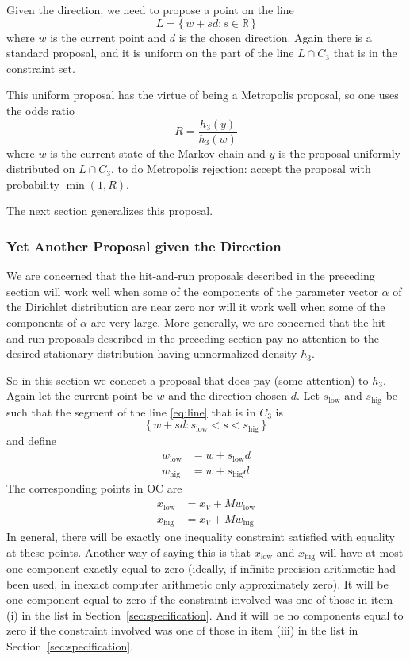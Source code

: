\documentclass[11pt]{article}
\newcommand{\real}{\mathbb{R}}
\newcommand{\set}[1]{\{\, #1 \,\}}
\begin{document}
Given the direction, we need to propose a point on the line
\begin{equation} \label{eq:line}
   L = \set{ w + s d : s \in \real }
\end{equation}
where $w$ is the current point and $d$ is the chosen direction.  Again
there is a standard proposal, and it is uniform on the part of the line
$L \cap C_3$ that is in the constraint set.

This uniform proposal has the virtue of being a Metropolis proposal,
so one uses the odds ratio
\begin{equation} \label{eq:metropolis-ratio}
   R = \frac{h_3(y)}{h_3(w)}
\end{equation}
where $w$ is the current state of the Markov chain and $y$ is the proposal
uniformly distributed on $L \cap C_3$, to do Metropolis rejection: accept
the proposal with probability $\min(1, R)$.

The next section generalizes this proposal.

\subsubsection{Yet Another Proposal given the Direction}

We are concerned that the hit-and-run proposals described in the
preceding section will work well when some of the components of the
parameter vector $\alpha$ of the Dirichlet distribution are near zero nor
will it work well when some of the components of $\alpha$ are very large.
More generally, we are concerned that the hit-and-run proposals described
in the preceding section pay no attention to the desired stationary
distribution having unnormalized density $h_3$.

So in this section we concoct a proposal that does pay (some attention)
to $h_3$.  Again let the current point be $w$ and the direction chosen $d$.
Let $s_\text{low}$ and $s_\text{hig}$ be such that the segment of the line
\eqref{eq:line} that is in $C_3$ is
$$
   \set{ w + s d : s_\text{low} < s < s_\text{hig} }
$$
and define
\begin{align*}
   w_\text{low} & = w + s_\text{low} d
   \\
   w_\text{hig} & = w + s_\text{hig} d
\end{align*}
The corresponding points in OC are
\begin{align*}
   x_\text{low} & = x_V + M w_\text{low}
   \\
   x_\text{hig} & = x_V + M w_\text{hig}
\end{align*}
In general, there will be exactly one inequality constraint satisfied with
equality at these points.
Another way of saying this is that $x_\text{low}$ and $x_\text{hig}$ will
have at most one component exactly equal to zero (ideally, if infinite
precision arithmetic had been used, in inexact computer arithmetic only
approximately zero).  It will be one component equal to zero if the constraint
involved was one of those in item (i) in the list
in Section~\ref{sec:specification}.  And it will be no components equal to zero
if the constraint involved was one of those in item (iii) in the list in
Section~\ref{sec:specification}.
\end{document}
